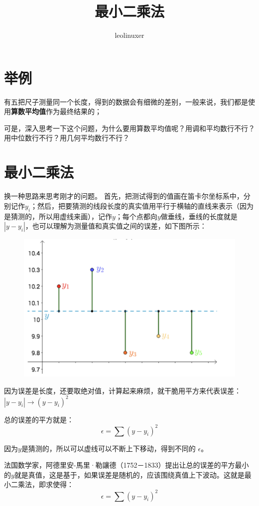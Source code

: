 \documentclass[12pt]{article}
\title{最小二乘法\cite{Understand_Least_Square_Method}}
\author{leolinuxer}
\begin{document}
\maketitle

\section{举例}
有五把尺子测量同一个长度，得到的数据会有细微的差别，一般来说，我们都是使用\textbf{算数平均值}作为最终结果的；

可是，深入思考一下这个问题，为什么要用算数平均值呢？用调和平均数行不行？用中位数行不行？用几何平均数行不行？

\section{最小二乘法}
换一种思路来思考刚才的问题。
首先，把测试得到的值画在笛卡尔坐标系中，分别记作$y_i$；然后，把要猜测的线段长度的真实值用平行于横轴的直线来表示（因为是猜测的，所以用虚线来画），记作$y$；每个点都向$y$做垂线，垂线的长度就是$|y-y_i|$，也可以理解为测量值和真实值之间的误差，如下图所示：
\begin{figure}[H]
  \centering
  \includegraphics[width=.8\textwidth]{fig/LeastSquareMethod_Example.png} 
\end{figure}

因为误差是长度，还要取绝对值，计算起来麻烦，就干脆用平方来代表误差：
$|y-y_i|\to (y-y_i)^2$

总的误差的平方就是：
$$
\epsilon=\sum (y-y_i)^2
$$

因为$y$是猜测的，所以可以虚线可以不断上下移动，得到不同的 $\epsilon$。

法国数学家，阿德里安-馬里·勒讓德（1752－1833）提出让总的误差的平方最小的$y$就是真值，这是基于，如果误差是随机的，应该围绕真值上下波动。这就是最小二乘法，即求使得：
$$
\epsilon=\sum (y-y_i)^2
$$
\end{document}
